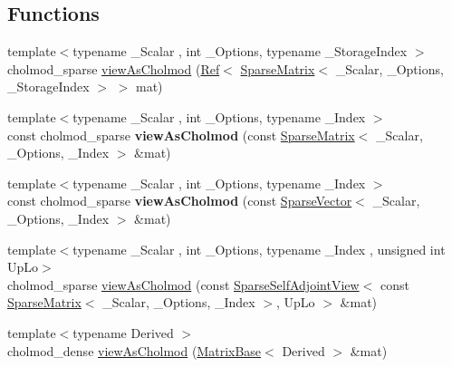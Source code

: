 \subsection*{Functions}
\begin{DoxyCompactItemize}
\item 
{\footnotesize template$<$typename \+\_\+\+Scalar , int \+\_\+\+Options, typename \+\_\+\+Storage\+Index $>$ }\\cholmod\+\_\+sparse \hyperlink{namespace_eigen_ac9fb9e40cfc9ddbdc7da84ee01bb7545}{view\+As\+Cholmod} (\hyperlink{group___core___module_class_eigen_1_1_ref}{Ref}$<$ \hyperlink{group___sparse_core___module_class_eigen_1_1_sparse_matrix}{Sparse\+Matrix}$<$ \+\_\+\+Scalar, \+\_\+\+Options, \+\_\+\+Storage\+Index $>$ $>$ mat)
\item 
\mbox{\label{namespace_eigen_a1e270b05389cb0c686c0dbb8696ea930}} 
{\footnotesize template$<$typename \+\_\+\+Scalar , int \+\_\+\+Options, typename \+\_\+\+Index $>$ }\\const cholmod\+\_\+sparse {\bfseries view\+As\+Cholmod} (const \hyperlink{group___sparse_core___module_class_eigen_1_1_sparse_matrix}{Sparse\+Matrix}$<$ \+\_\+\+Scalar, \+\_\+\+Options, \+\_\+\+Index $>$ \&mat)
\item 
\mbox{\label{namespace_eigen_ae05afad80a00ea7af7432a096875d2e0}} 
{\footnotesize template$<$typename \+\_\+\+Scalar , int \+\_\+\+Options, typename \+\_\+\+Index $>$ }\\const cholmod\+\_\+sparse {\bfseries view\+As\+Cholmod} (const \hyperlink{group___sparse_core___module_class_eigen_1_1_sparse_vector}{Sparse\+Vector}$<$ \+\_\+\+Scalar, \+\_\+\+Options, \+\_\+\+Index $>$ \&mat)
\item 
{\footnotesize template$<$typename \+\_\+\+Scalar , int \+\_\+\+Options, typename \+\_\+\+Index , unsigned int Up\+Lo$>$ }\\cholmod\+\_\+sparse \hyperlink{namespace_eigen_afacb818b18280e2e1ab73836ab74cab5}{view\+As\+Cholmod} (const \hyperlink{group___sparse_core___module_class_eigen_1_1_sparse_self_adjoint_view}{Sparse\+Self\+Adjoint\+View}$<$ const \hyperlink{group___sparse_core___module_class_eigen_1_1_sparse_matrix}{Sparse\+Matrix}$<$ \+\_\+\+Scalar, \+\_\+\+Options, \+\_\+\+Index $>$, Up\+Lo $>$ \&mat)
\item 
{\footnotesize template$<$typename Derived $>$ }\\cholmod\+\_\+dense \hyperlink{namespace_eigen_a92fe7b595099051fa1d1c443641a6de3}{view\+As\+Cholmod} (\hyperlink{group___core___module_class_eigen_1_1_matrix_base}{Matrix\+Base}$<$ Derived $>$ \&mat)

\end{DoxyCompactItemize}
